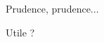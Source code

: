 \begin{bdocwarning}
    Prudence, prudence...
\end{bdocwarning}

\begin{bdocwarning}
    Utile ?
\end{bdocwarning}
